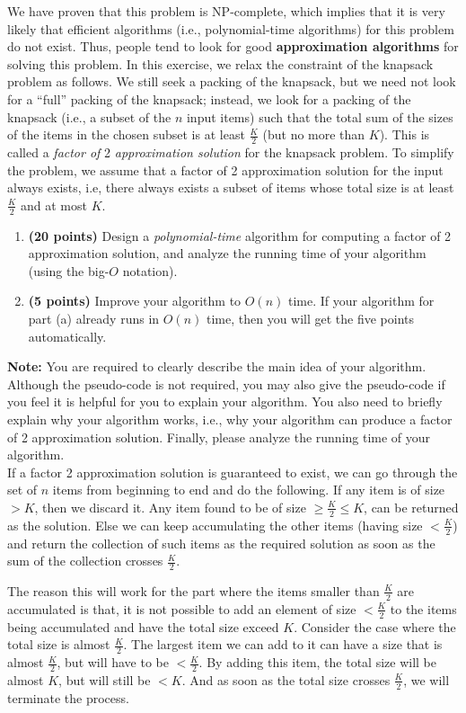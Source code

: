 \documentclass[paper=a4, fontsize=11pt]{scrartcl} %
\numberwithin{equation}{section} %
\numberwithin{figure}{section} %
\numberwithin{table}{section} %
\begin{document}
\begin{enumerate}
We have proven that this problem is NP-complete, which implies that it is very likely that efficient algorithms (i.e., polynomial-time algorithms) for this problem do not exist. Thus, people tend to look for good \textbf{approximation algorithms} for solving this problem. In this exercise, we relax the constraint of the knapsack problem as follows. We still seek a packing of the knapsack, but we need not look for a \enquote{full} packing of the knapsack; instead, we look for a packing of the knapsack (i.e., a subset of the $n$ input items) such that the total sum of the sizes of the items in the chosen subset is at least $\frac{K}{2}$ (but no more than $K$). This is called a \emph{factor of} 2 \emph{approximation solution} for the knapsack problem. To simplify the problem, we assume that a factor of 2 approximation solution for the input always exists, i.e, there always exists a subset of items whose total size is at least $\frac{K}{2}$ and at most $K$.
\begin{enumerate}
\item \textbf{(20 points)} Design a \emph{polynomial-time} algorithm for computing a factor of 2 approximation solution, and analyze the running time of your algorithm (using the big-$O$ notation).
\item \textbf{(5 points)} Improve your algorithm to $O(n)$ time. If your algorithm for part (a) already runs in $O(n)$ time, then you will get the five points automatically.
\end{enumerate}
\textbf{Note:} You are required to clearly describe the main idea of your algorithm. Although the pseudo-code is not required, you may also give the pseudo-code if you feel it is helpful for you to explain your algorithm. You also need to briefly explain why your algorithm works, i.e., why your algorithm can produce a factor of 2 approximation solution. Finally, please analyze the running time of your algorithm.\\

If a factor 2 approximation solution is guaranteed to exist, we can go through the set of $n$ items from beginning to end and do the following. If any item is of size $ > K$, then we discard it. Any item found to be of size $ \ge \frac{K}{2} \le K$, can be returned as the solution. Else we can keep accumulating the other items (having size $< \frac{K}{2}$) and return the collection of such items as the required solution as soon as the sum of the collection crosses $\frac{K}{2}$. 

The reason this will work for the part where the items smaller than $\frac{K}{2}$ are accumulated is that, it is not possible to add an element of size $< \frac{K}{2}$ to the items being accumulated and have the total size exceed $K$. Consider the case where the total size is almost $\frac{K}{2}$. The largest item we can add to it can have a size that is almost $\frac{K}{2}$, but will have to be $< \frac{K}{2}$. By adding this item, the total size will be almost $K$, but will still be $< K$. And as soon as the total size crosses $\frac{K}{2}$, we will terminate the process.


\end{enumerate}
\end{document}
